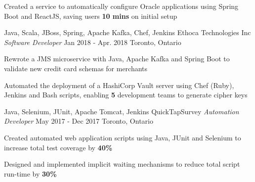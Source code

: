 \begin{siderules}
\begin{cventries}
{\begin{cvitems}
          \item {Created a service to automatically configure Oracle applications using Spring Boot and ReactJS, saving users \textbf{10 mins} on initial setup}
        \end{cvitems}
      }
    \cventry
      {Java, Scala, JBoss, Spring, Apache Kafka, Chef, Jenkins}
      {Ethoca Technologies Inc \hspace{0.15em} \bodyfontlight\itshape{Software Developer}}
      {Jan 2018 - Apr. 2018}
      {Toronto, Ontario}
      {
        \begin{cvitems}
          \item {Rewrote a JMS microservice with Java, Apache Kafka and Spring Boot to validate new credit card schemas for merchants}
          \item {Automated the deployment of a HashiCorp Vault server using Chef (Ruby), Jenkins and Bash scripts, enabling \textbf{5} development teams to generate cipher keys}
        \end{cvitems}
      }
    \cventry
      {Java, Selenium, JUnit, Apache Tomcat, Jenkins}
      {QuickTapSurvey \hspace{0.15em} \bodyfontlight\itshape{Automation Developer}}
      {May 2017 - Dec 2017}
      {Toronto, Ontario}
      {
        \begin{cvitems}
          \item {Created automated web application scripts using Java, JUnit and Selenium to increase total test coverage by \textbf{40\%}}
          \item {Designed and implemented implicit waiting mechanisms to reduce total script run-time by \textbf{30\%}}
        \end{cvitems}
      }
  \end{cventries}
\end{siderules}